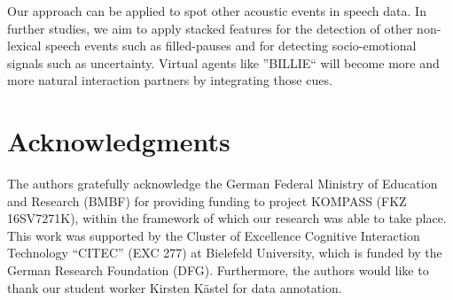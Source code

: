 \documentclass[letterpaper]{article}
\begin{document}
Our approach can be applied to spot other acoustic events in speech data. In further studies, we aim to apply stacked features for the detection of other non-lexical speech events such as filled-pauses and for detecting socio-emotional signals such as uncertainty. Virtual agents like ''BILLIE`` will become more and more natural interaction partners by integrating those cues.
\section*{Acknowledgments}
The authors gratefully acknowledge the German Federal Ministry of Education and Research (BMBF) for providing funding to project KOMPASS (FKZ 16SV7271K),
within the framework of which our research was able to take place. 
This work was supported by the Cluster of Excellence Cognitive Interaction Technology ``CITEC'' (EXC 277) at Bielefeld University, which is funded by the German Research Foundation (DFG). 
Furthermore, the authors would like to thank our student worker Kirsten K\"astel for data annotation.


\end{document}
